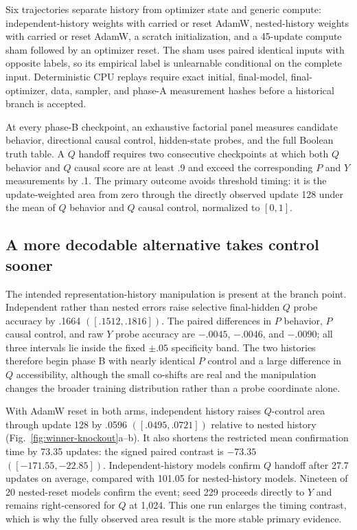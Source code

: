 \documentclass[11pt,a4paper]{article}
\newcommand{\fig}[1]{Fig.~\ref{#1}}
\begin{document}
Six trajectories separate history from optimizer state and generic compute: independent-history weights with carried or reset AdamW, nested-history weights with carried or reset AdamW, a scratch initialization, and a 45-update compute sham followed by an optimizer reset. The sham uses paired identical inputs with opposite labels, so its empirical label is unlearnable conditional on the complete input. Deterministic CPU replays require exact initial, final-model, final-optimizer, data, sampler, and phase-A measurement hashes before a historical branch is accepted.

At every phase-B checkpoint, an exhaustive factorial panel measures candidate behavior, directional causal control, hidden-state probes, and the full Boolean truth table. A $Q$ handoff requires two consecutive checkpoints at which both $Q$ behavior and $Q$ causal score are at least .9 and exceed the corresponding $P$ and $Y$ measurements by .1. The primary outcome avoids threshold timing: it is the update-weighted area from zero through the directly observed update 128 under the mean of $Q$ behavior and $Q$ causal control, normalized to $[0,1]$.

\subsection*{A more decodable alternative takes control sooner}

The intended representation-history manipulation is present at the branch point. Independent rather than nested errors raise selective final-hidden $Q$ probe accuracy by .1664 $([.1512,.1816])$. The paired differences in $P$ behavior, $P$ causal control, and raw $Y$ probe accuracy are $-.0045$, $-.0046$, and $-.0090$; all three intervals lie inside the fixed $\pm.05$ specificity band. The two histories therefore begin phase B with nearly identical $P$ control and a large difference in $Q$ accessibility, although the small co-shifts are real and the manipulation changes the broader training distribution rather than a probe coordinate alone.

With AdamW reset in both arms, independent history raises $Q$-control area through update 128 by .0596 $([.0495,.0721])$ relative to nested history (\fig{fig:winner-knockout}a--b). It also shortens the restricted mean confirmation time by 73.35 updates: the signed paired contrast is $-73.35$ $([-171.55,-22.85])$. Independent-history models confirm $Q$ handoff after 27.7 updates on average, compared with 101.05 for nested-history models. Nineteen of 20 nested-reset models confirm the event; seed 229 proceeds directly to $Y$ and remains right-censored for $Q$ at 1,024. This one run enlarges the timing contrast, which is why the fully observed area result is the more stable primary evidence.
\end{document}
